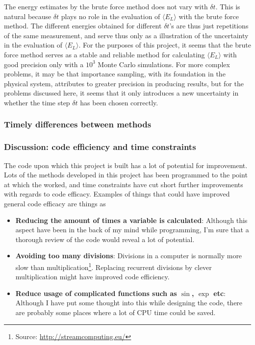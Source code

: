 The energy estimates by the brute force method does not vary with $\delta t$. 
This is natural because $\delta t$ plays no role in the evaluation of $\langle E_L \rangle$ with the brute force method. 
The different energies obtained for different $\delta t$'s are thus just repetitions of the same measurement, and serve thus only as a illustration of the uncertainty in the evaluation of $\langle E_L \rangle$. 
For the purposes of this project, it seems that the brute force method serves as a stable and reliable method for calculating $\langle E_L \rangle$ with good precision only with a $10^3$ Monte Carlo simulations. 
For more complex problems, it may be that importance sampling, with its foundation in the physical system, attributes to greater precision in producing results, but for the problems discussed here, it seems that it only introduces a new uncertainty in whether the time step $\delta t$ has been chosen correctly. 











\subsubsection{Timely differences between methods} \label{sec:timely_diff}

\subsubsection{Discussion: code efficiency and time constraints}\label{sec:ce_tc}

The code upon which this project is built has a lot of potential for improvement. 
Lots of the methods developed in this project has been programmed to the point at which the worked, and time constraints have cut short further improvements with regards to code efficacy.
Examples of things that could have improved general code efficacy are things as 

\begin{itemize}
	\item \textbf{Reducing the amount of times a variable is calculated}:
	Although this aspect have been in the back of my mind while programming, I'm sure that a thorough review of the code would reveal a lot of potential. 
	\item \textbf{Avoiding too many divisions}: 
	Divisions in a computer is normally more slow than multiplication\footnote{Source: \href{http://streamcomputing.eu/blog/2012-07-16/how-expensive-is-an-operation-on-a-cpu/}{http://streamcomputing.eu/}}. Replacing recurrent divisions by clever multiplication might have improved code efficiency.
	\item \textbf{Reduce usage of complicated functions such as $\sin$, $\exp$ etc}:
	Although I have put some thought into this while designing the code, there are probably some places where a lot of CPU time could be saved. 
\end{itemize}


